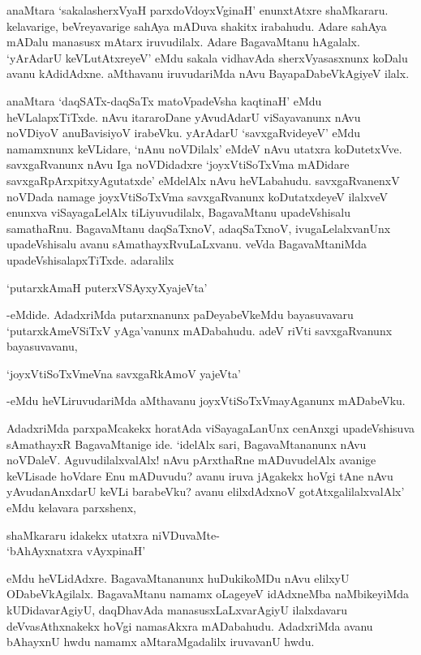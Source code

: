 anaMtara `sakalasherxVyaH parxdoVdoyxVginaH' enunxtAtxre shaMkararu. kelavarige, beVreyavarige sahAya mADuva shakitx irabahudu. Adare sahAya mADalu manasusx mAtarx iruvudilalx. Adare BagavaMtanu hAgalalx. `yArAdarU keVLutAtxreyeV' eMdu sakala vidhavAda sherxVyasasxnunx koDalu avanu kAdidAdxne. aMthavanu iruvudariMda nAvu BayapaDabeVkAgiyeV ilalx.

anaMtara `daqSATx-daqSaTx matoVpadeVsha kaqtinaH' eMdu heVLalapxTiTxde. nAvu itararoDane yAvudAdarU viSayavanunx nAvu noVDiyoV anuBavisiyoV irabeVku. yArAdarU `savxgaRvideyeV' eMdu namamxnunx keVLidare, `nAnu noVDilalx' eMdeV nAvu utatxra koDutetxVve. savxgaRvanunx nAvu Iga noVDidadxre `joyxVtiSoTxVma mADidare savxgaRpArxpitxyAgutatxde' eMdelAlx nAvu heVLabahudu. savxgaRvanenxV noVDada namage joyxVtiSoTxVma savxgaRvanunx koDutatxdeyeV ilalxveV enunxva viSayagaLelAlx tiLiyuvudilalx, BagavaMtanu upadeVshisalu samathaRnu. BagavaMtanu daqSaTxnoV, adaqSaTxnoV, ivugaLelalxvanUnx upadeVshisalu avanu sAmathayxRvuLaLxvanu. veVda BagavaMtaniMda upadeVshisalapxTiTxde. adaralilx

\begin{shloka}
`putarxkAmaH puterxVSAyxyXyajeVta'
\end{shloka}

-eMdide. AdadxriMda putarxnanunx paDeyabeVkeMdu bayasuvavaru `putarxkAmeVSiTxV yAga'vanunx mADabahudu. adeV riVti savxgaRvanunx bayasuvavanu,

\begin{shloka}
`joyxVtiSoTxVmeVna savxgaRkAmoV yajeVta'
\end{shloka}

-eMdu heVLiruvudariMda aMthavanu joyxVtiSoTxVmayAganunx mADabeVku.

AdadxriMda parxpaMcakekx horatAda viSayagaLanUnx cenAnxgi upadeVshisuva sAmathayxR BagavaMtanige ide. `idelAlx sari, BagavaMtananunx nAvu noVDaleV. AguvudilalxvalAlx! nAvu pArxthaRne mADuvudelAlx avanige keVLisade hoVdare Enu mADuvudu? avanu iruva jAgakekx hoVgi tAne nAvu yAvudanAnxdarU keVLi barabeVku? avanu elilxdAdxnoV gotAtxgalilalxvalAlx' eMdu kelavara parxshenx,

\begin{center}
shaMkararu idakekx utatxra niVDuvaMte-\\
`bAhAyxnatxra vAyxpinaH'
\end{center}

eMdu heVLidAdxre. BagavaMtananunx huDukikoMDu nAvu elilxyU ODabeVkAgilalx. BagavaMtanu namamx oLageyeV idAdxneMba naMbikeyiMda kUDidavarAgiyU, daqDhavAda manasusxLaLxvarAgiyU ilalxdavaru deVvasAthxnakekx hoVgi namasAkxra mADabahudu. AdadxriMda avanu bAhayxnU hwdu namamx aMtaraMgadalilx iruvavanU hwdu.

